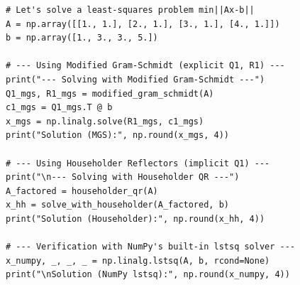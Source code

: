 \begin{verbatim}
# Let's solve a least-squares problem min||Ax-b||
A = np.array([[1., 1.], [2., 1.], [3., 1.], [4., 1.]])
b = np.array([1., 3., 3., 5.])

# --- Using Modified Gram-Schmidt (explicit Q1, R1) ---
print("--- Solving with Modified Gram-Schmidt ---")
Q1_mgs, R1_mgs = modified_gram_schmidt(A)
c1_mgs = Q1_mgs.T @ b
x_mgs = np.linalg.solve(R1_mgs, c1_mgs)
print("Solution (MGS):", np.round(x_mgs, 4))

# --- Using Householder Reflectors (implicit Q1) ---
print("\n--- Solving with Householder QR ---")
A_factored = householder_qr(A)
x_hh = solve_with_householder(A_factored, b)
print("Solution (Householder):", np.round(x_hh, 4))

# --- Verification with NumPy's built-in lstsq solver ---
x_numpy, _, _, _ = np.linalg.lstsq(A, b, rcond=None)
print("\nSolution (NumPy lstsq):", np.round(x_numpy, 4))
\end{verbatim}